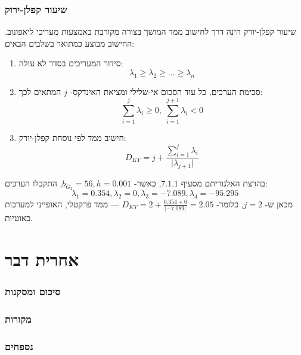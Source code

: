 \documentclass{report}
\begin{document}
\section{שיעור קפלן-ירוק}
שיעור קפלן-יורק הינה דרך לחישוב ממד המושך בצורה מקורבת באמצעות מעריכי ליאפונוב. החישוב מבוצע כמתואר בשלבים הבאים:
\begin{enumerate}
    \item סידור המעריכים בסדר לא עולה: \[\lambda_1\geq\lambda_2\geq\ldots\geq\lambda_n\]
    \item סכימת הערכים, כל עוד הסכום אי-שלילי ומציאת האינדקס- \(j\) המתאים לכך: \[\sum_{i=1}^{j}\lambda_i\geq0,\;\sum_{i=1}^{j+1}\lambda_i<0\]
    \item חישוב ממד לפי נוסחת קפלן-יורק: \[D_{KY}=j+\frac{\sum\limits_{i=1}^{j}\lambda_i}{\lvert\lambda_{j+1}\rvert}\]
\end{enumerate}
בהרצת האלגוריתם מסעיף \(7.1.1\), כאשר- \(b_{G_2}=56,h=0.001\), התקבלו הערכים:
\[\lambda_1=0.354,\lambda_2=0,\lambda_3=-7.089,\lambda_4=-95.295\]
מכאן ש- \(j=2\), כלומר- \(D_{KY}=2+\frac{0.354+0}{\lvert-7.089\rvert}=2.05\) — ממד פרקטלי, האופייני למערכות כאוטיות.
\part{אחרית דבר}
\section*{סיכום ומסקנות}
\section*{מקורות}
\nocite{*}
\begin{otherlanguage}{English}
\printbibliography[heading=none]
\end{otherlanguage}
\section*{נספחים}
\end{document}
